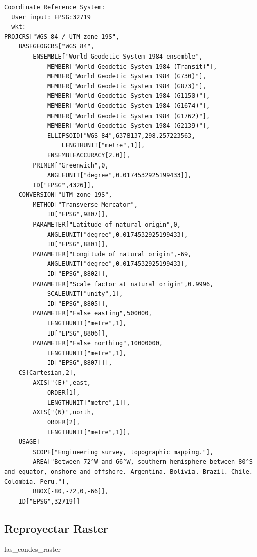 \documentclass[
  letterpaper,
  DIV=11,
  numbers=noendperiod]{scrreprt}
\newenvironment{Shaded}{\begin{snugshade}}{\end{snugshade}}
\newcommand{\NormalTok}[1]{\textcolor[rgb]{0.00,0.23,0.31}{#1}}
\begin{document}
\begin{verbatim}
Coordinate Reference System:
  User input: EPSG:32719 
  wkt:
PROJCRS["WGS 84 / UTM zone 19S",
    BASEGEOGCRS["WGS 84",
        ENSEMBLE["World Geodetic System 1984 ensemble",
            MEMBER["World Geodetic System 1984 (Transit)"],
            MEMBER["World Geodetic System 1984 (G730)"],
            MEMBER["World Geodetic System 1984 (G873)"],
            MEMBER["World Geodetic System 1984 (G1150)"],
            MEMBER["World Geodetic System 1984 (G1674)"],
            MEMBER["World Geodetic System 1984 (G1762)"],
            MEMBER["World Geodetic System 1984 (G2139)"],
            ELLIPSOID["WGS 84",6378137,298.257223563,
                LENGTHUNIT["metre",1]],
            ENSEMBLEACCURACY[2.0]],
        PRIMEM["Greenwich",0,
            ANGLEUNIT["degree",0.0174532925199433]],
        ID["EPSG",4326]],
    CONVERSION["UTM zone 19S",
        METHOD["Transverse Mercator",
            ID["EPSG",9807]],
        PARAMETER["Latitude of natural origin",0,
            ANGLEUNIT["degree",0.0174532925199433],
            ID["EPSG",8801]],
        PARAMETER["Longitude of natural origin",-69,
            ANGLEUNIT["degree",0.0174532925199433],
            ID["EPSG",8802]],
        PARAMETER["Scale factor at natural origin",0.9996,
            SCALEUNIT["unity",1],
            ID["EPSG",8805]],
        PARAMETER["False easting",500000,
            LENGTHUNIT["metre",1],
            ID["EPSG",8806]],
        PARAMETER["False northing",10000000,
            LENGTHUNIT["metre",1],
            ID["EPSG",8807]]],
    CS[Cartesian,2],
        AXIS["(E)",east,
            ORDER[1],
            LENGTHUNIT["metre",1]],
        AXIS["(N)",north,
            ORDER[2],
            LENGTHUNIT["metre",1]],
    USAGE[
        SCOPE["Engineering survey, topographic mapping."],
        AREA["Between 72°W and 66°W, southern hemisphere between 80°S and equator, onshore and offshore. Argentina. Bolivia. Brazil. Chile. Colombia. Peru."],
        BBOX[-80,-72,0,-66]],
    ID["EPSG",32719]]
\end{verbatim}

\hypertarget{reproyectar-raster}{%
\subsection{Reproyectar Raster}\label{reproyectar-raster}}

\begin{Shaded}
\begin{Highlighting}[]
\NormalTok{las\_condes\_raster}
\end{Highlighting}
\end{Shaded}
\end{document}
